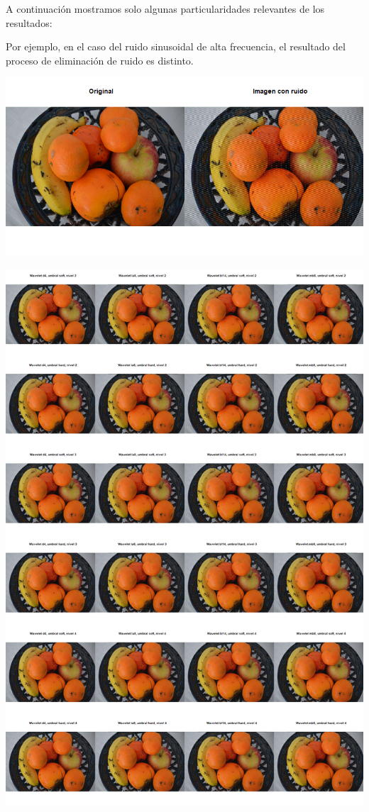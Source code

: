 \documentclass[
]{article}
\begin{document}
A continuación mostramos solo algunas particularidades relevantes de los
resultados:

Por ejemplo, en el caso del ruido sinusoidal de alta frecuencia, el
resultado del proceso de eliminación de ruido es distinto.

\begin{center}\includegraphics[width=0.5\linewidth,height=0.5\textheight]{denoisedwt2d/sinhigh} \end{center}

\begin{center}\includegraphics[width=1\linewidth]{denoisedwt2d/sinhigh_denoised} \end{center}
\end{document}
